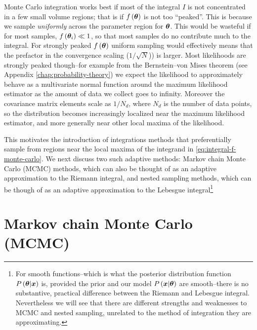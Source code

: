 Monte Carlo integration works best if most of the integral $I$ is not concentrated in a few small volume regions; that is if $f\left({\bm \theta}\right)$ is not too ``peaked''.
This is because we sample \emph{uniformly} across the parameter region for ${\bm \theta}$.
This would be wasteful if for most samples, $f\left({\bm \theta}_i\right)\ll1$, so that most samples do no contribute much to the integral.
For strongly peaked $f\left({\bm \theta}\right)$ uniform sampling would effectively means that the prefactor in the convergence scaling ($1/\sqrt{N}$)) is larger.
Most likelihoods are strongly peaked though--for example from the Bernstein–von Mises theorem (see Appendix \ref{chap:probability-theory}) we expect the likelihood to approximately behave as a multivariate normal function around the maximum likelihood estimator as the amount of data we collect goes to infinity. 
Moreover the covariance matrix elements scale as $1/N_d$, where $N_d$ is the number of data points, so the distribution becomes increasingly localized near the maximum likelihood estimator, and more generally near other local maxima of the likelihood.

This motivates the introduction of integrations methods that preferentially sample
from regions near the local maxima of the integrand in 
\eqref{eq:integral-f-monte-carlo}.
We next discuss two such adaptive methods:
Markov chain Monte Carlo (MCMC) methods, which can
also be thought of as an adaptive approximation to the Riemann integral, and
nested sampling methods, which can be though of as an adaptive approximation 
to the Lebesgue integral\footnote{For smooth functions--which is what the posterior distribution
function $P\left({\bm \theta}|{\bm x}\right)$ is, provided the prior and 
our model $P\left({\bm x}|{\bm \theta}\right)$ are smooth--there 
is no substantive, practical difference between the Riemann and Lebesgue integral.
Nevertheless we will see that there are different strengths and weaknesses
to MCMC and nested sampling, 
unrelated to the method of integration they are approximating.} 

\section{Markov chain Monte Carlo (MCMC)\label{sec:mcmc}}


